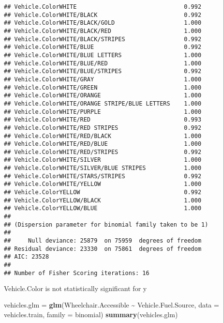 \documentclass[
]{article}
\newenvironment{Shaded}{\begin{snugshade}}{\end{snugshade}}
\newcommand{\AttributeTok}[1]{\textcolor[rgb]{0.13,0.29,0.53}{#1}}
\newcommand{\FunctionTok}[1]{\textcolor[rgb]{0.13,0.29,0.53}{\textbf{#1}}}
\newcommand{\NormalTok}[1]{#1}
\newcommand{\OtherTok}[1]{\textcolor[rgb]{0.56,0.35,0.01}{#1}}
\newcommand{\SpecialCharTok}[1]{\textcolor[rgb]{0.81,0.36,0.00}{\textbf{#1}}}
\begin{document}
\begin{verbatim}
## Vehicle.ColorWHITE                               0.992
## Vehicle.ColorWHITE/BLACK                         0.992
## Vehicle.ColorWHITE/BLACK/GOLD                    1.000
## Vehicle.ColorWHITE/BLACK/RED                     1.000
## Vehicle.ColorWHITE/BLACK/STRIPES                 0.992
## Vehicle.ColorWHITE/BLUE                          0.992
## Vehicle.ColorWHITE/BLUE LETTERS                  1.000
## Vehicle.ColorWHITE/BLUE/RED                      1.000
## Vehicle.ColorWHITE/BLUE/STRIPES                  0.992
## Vehicle.ColorWHITE/GRAY                          1.000
## Vehicle.ColorWHITE/GREEN                         1.000
## Vehicle.ColorWHITE/ORANGE                        1.000
## Vehicle.ColorWHITE/ORANGE STRIPE/BLUE LETTERS    1.000
## Vehicle.ColorWHITE/PURPLE                        1.000
## Vehicle.ColorWHITE/RED                           0.993
## Vehicle.ColorWHITE/RED STRIPES                   0.992
## Vehicle.ColorWHITE/RED/BLACK                     1.000
## Vehicle.ColorWHITE/RED/BLUE                      1.000
## Vehicle.ColorWHITE/RED/STRIPES                   0.992
## Vehicle.ColorWHITE/SILVER                        1.000
## Vehicle.ColorWHITE/SILVER/BLUE STRIPES           1.000
## Vehicle.ColorWHITE/STARS/STRIPES                 0.992
## Vehicle.ColorWHITE/YELLOW                        1.000
## Vehicle.ColorYELLOW                              0.992
## Vehicle.ColorYELLOW/BLACK                        1.000
## Vehicle.ColorYELLOW/BLUE                         1.000
## 
## (Dispersion parameter for binomial family taken to be 1)
## 
##     Null deviance: 25879  on 75959  degrees of freedom
## Residual deviance: 23330  on 75861  degrees of freedom
## AIC: 23528
## 
## Number of Fisher Scoring iterations: 16
\end{verbatim}

Vehicle.Color is not statistically significant for y

\begin{Shaded}
\begin{Highlighting}[]
\NormalTok{vehicles.glm }\OtherTok{=} \FunctionTok{glm}\NormalTok{(Wheelchair.Accessible }\SpecialCharTok{\textasciitilde{}}\NormalTok{ Vehicle.Fuel.Source, }\AttributeTok{data =}\NormalTok{ vehicles.train, }
                   \AttributeTok{family =}\NormalTok{ binomial)}
\FunctionTok{summary}\NormalTok{(vehicles.glm)}
\end{Highlighting}
\end{Shaded}
\end{document}
